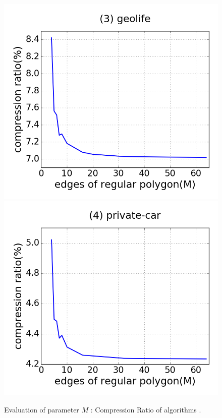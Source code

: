 \begin{figure}[tb!]
\includegraphics[scale = 0.24]{figures/Exp-M-cr-geolife.png}
\includegraphics[scale = 0.24]{figures/Exp-M-cr-private.png}
\vspace{-2ex}
\caption{\small Evaluation of parameter $M$ : Compression Ratio of algorithms \cist.}
\label{fig:m-cr-cist}
\vspace{-1ex}
\end{figure}


